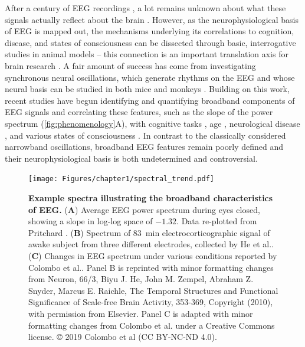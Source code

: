 After a century of EEG recordings \cite{Berger1929}, a lot remains unknown about what these signals actually reflect about the brain \cite{Cohen2017}. However, as the neurophysiological basis of EEG is mapped out, the mechanisms underlying its correlations to cognition, disease, and states of consciousness can be dissected through basic, interrogative studies in animal models -- this connection is an important translation axis for brain research \cite{da2013eeg}. A fair amount of success has come from investigating synchronous neural oscillations, which generate rhythms on the EEG and whose neural basis can be studied in both mice and monkeys \cite{Buzsaki2004}. Building on this work, recent studies have begun identifying and quantifying broadband components of EEG signals and correlating these features, such as the slope of the power spectrum (\autoref{fig:phenomenology}A), with cognitive tasks \cite{Ouyang2020,Podvalny2015,He2010,Waschke2021}, age \cite{Voytek2015}, neurological disease \cite{Wang2022, Pertermann2019, Schaworonkow2021, OSTLUND2021100931, MOLINA2020562, Robertson2019, Roche2019}, and various states of consciousness \cite{Colombo2019, Stock2020, Lendner2020, MUTHUKUMARASWAMY2018582}. In contrast to the classically considered narrowband oscillations, broadband EEG features remain poorly defined and their neurophysiological basis is both undetermined and controversial. 

\begin{figure}[b!]
    \centering
    \texttt{[image: Figures/chapter1/spectral\_trend.pdf]}
    
    \caption{\textbf{Example spectra illustrating the broadband characteristics of EEG.} 
    (\textbf{A}) Average EEG power spectrum during eyes closed, showing a slope in log-log space of $-1.32$. Data re-plotted from Pritchard \cite{Pritchard1992}. (\textbf{B}) Spectrum of \qty{83}{\minute} electrocorticographic signal of awake subject from three different electrodes, collected by He et al.\cite{He2010}.  (\textbf{C}) Changes in EEG spectrum under various conditions reported by Colombo et al.\cite{Colombo2019}. Panel B is reprinted with minor formatting changes from Neuron, 66/3, Biyu J. He, John M. Zempel, Abraham Z. Snyder, Marcus E. Raichle, The Temporal Structures and Functional Significance of Scale-free Brain Activity, 353-369, Copyright (2010), with permission from Elsevier. Panel C is adapted with minor formatting changes from Colombo et al. \cite{Colombo2019} under a Creative Commons license. © 2019 Colombo et al (CC BY-NC-ND 4.0).
    } 
    \label{fig:phenomenology}
\end{figure}

